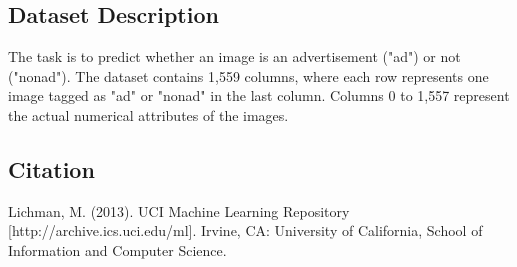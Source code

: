 \documentclass[twoside,final]{hcmut-report}
\begin{document}
\subsection*{Dataset Description}
The task is to predict whether an image is an advertisement ("ad") or not ("nonad"). The dataset contains 1,559 columns, where each row represents one image tagged as "ad" or "nonad" in the last column. Columns 0 to 1,557 represent the actual numerical attributes of the images.

\subsection*{Citation}
Lichman, M. (2013). UCI Machine Learning Repository [http://archive.ics.uci.edu/ml]. Irvine, CA: University of California, School of Information and Computer Science.

\clearpage



\nocite{*}
\end{document}

